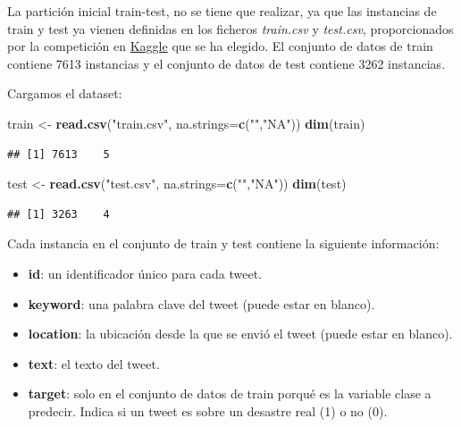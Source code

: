 \documentclass[
]{article}
\newenvironment{Shaded}{\begin{snugshade}}{\end{snugshade}}
\newcommand{\DataTypeTok}[1]{\textcolor[rgb]{0.13,0.29,0.53}{#1}}
\newcommand{\KeywordTok}[1]{\textcolor[rgb]{0.13,0.29,0.53}{\textbf{#1}}}
\newcommand{\NormalTok}[1]{#1}
\newcommand{\StringTok}[1]{\textcolor[rgb]{0.31,0.60,0.02}{#1}}
\providecommand{\tightlist}{%
  \setlength{\itemsep}{0pt}\setlength{\parskip}{0pt}}
\begin{document}
La partición inicial train-test, no se tiene que realizar, ya que las
instancias de train y test ya vienen definidas en los ficheros
\emph{train.csv} y \emph{test.csv}, proporcionados por la competición en
\href{https://www.kaggle.com/c/nlp-getting-started/overview}{Kaggle} que
se ha elegido. El conjunto de datos de train contiene 7613 instancias y
el conjunto de datos de test contiene 3262 instancias.

Cargamos el dataset:

\begin{Shaded}
\begin{Highlighting}[]
\NormalTok{train <-}\StringTok{ }\KeywordTok{read.csv}\NormalTok{(}\StringTok{"train.csv"}\NormalTok{, }\DataTypeTok{na.strings=}\KeywordTok{c}\NormalTok{(}\StringTok{""}\NormalTok{,}\StringTok{"NA"}\NormalTok{))}
\KeywordTok{dim}\NormalTok{(train)}
\end{Highlighting}
\end{Shaded}

\begin{verbatim}
## [1] 7613    5
\end{verbatim}

\begin{Shaded}
\begin{Highlighting}[]
\NormalTok{test <-}\StringTok{ }\KeywordTok{read.csv}\NormalTok{(}\StringTok{"test.csv"}\NormalTok{, }\DataTypeTok{na.strings=}\KeywordTok{c}\NormalTok{(}\StringTok{""}\NormalTok{,}\StringTok{"NA"}\NormalTok{))}
\KeywordTok{dim}\NormalTok{(test)}
\end{Highlighting}
\end{Shaded}

\begin{verbatim}
## [1] 3263    4
\end{verbatim}

Cada instancia en el conjunto de train y test contiene la siguiente
información:

\begin{itemize}
\tightlist
\item
  \textbf{id}: un identificador único para cada tweet.
\item
  \textbf{keyword}: una palabra clave del tweet (puede estar en blanco).
\item
  \textbf{location}: la ubicación desde la que se envió el tweet (puede
  estar en blanco).
\item
  \textbf{text}: el texto del tweet.
\item
  \textbf{target}: solo en el conjunto de datos de train porqué es la
  variable clase a predecir. Indica si un tweet es sobre un desastre
  real (1) o no (0).
\end{itemize}
\end{document}
